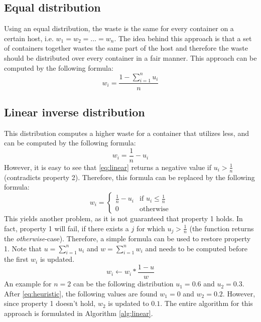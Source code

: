 \subsection{Equal distribution} \label{sec:equal}
Using an equal distribution, the waste is the same for every container on a certain host, i.e. $w_1 = w_2 = \dots = w_n$. The idea behind this approach is that a set of containers together wastes the same part of the host and therefore the waste should be distributed over every container in a fair manner. This approach can be computed by the following formula:
\begin{equation}
w_i = \frac{1 - \sum_{i=1}^n u_i}{n}
\end{equation}

\subsection{Linear inverse distribution} \label{sec:linear}
This distribution computes a higher waste for a container that utilizes less, and can be computed by the following formula:
\begin{equation} \label{eq:linear}
w_i = \frac{1}{n} - u_i
\end{equation}
However, it is easy to see that \autoref{eq:linear} returns a negative value if $u_i > \frac{1}{n}$ (contradicts property 2). Therefore, this formula can be replaced by the following formula:
\begin{equation}\label{eq:heuristic}
w_i = \begin{cases}
\frac{1}{n} - u_i & \text{if } u_i \leq \frac{1}{n}\\
0                 & \text{otherwise}
\end{cases}
\end{equation}
This yields another problem, as it is not guaranteed that property 1 holds. In fact, property 1 will fail, if there exists a $j$ for which $u_j > \frac{1}{n}$ (the function returns the \textit{otherwise}-case). Therefore, a simple formula can be used to restore property 1. Note that $u = \sum_{i=1}^n u_i$ and $w = \sum_{i=1}^n w_i$ and needs to be computed before the first $w_i$ is updated.
\begin{equation} \label{eq:update}
    w_i \leftarrow w_i * \frac{1-u}{w}
\end{equation}
An example for $n = 2$ can be the following distribution $u_1 = 0.6$ and $u_2 = 0.3$. After \autoref{eq:heuristic}, the following values are found $w_1 = 0$ and $w_2 = 0.2$. However, since property 1 doesn't hold, $w_2$ is updated to $0.1$. The entire algorithm for this approach is formulated in Algorithm \ref{alg:linear}.

